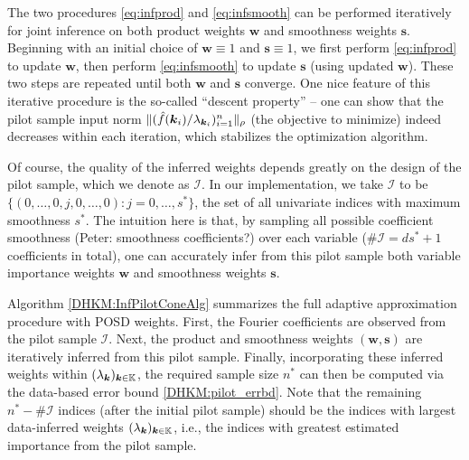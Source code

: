 \documentclass[USenglish]{article}
\theoremstyle{dgthm}
\theoremstyle{dgthm}
\theoremstyle{dgthm}
\theoremstyle{dgthm}
\theoremstyle{dgdef}
\newcommand{\PeterNote}[1]{{\color{orange}Peter: #1}}
\begin{document}
The two procedures \eqref{eq:infprod} and \eqref{eq:infsmooth} can be performed iteratively for joint inference on both product weights $\mathbf{w}$ and smoothness weights $\mathbf{s}$. Beginning with an initial choice of $\mathbf{w} \equiv 1$ and $\mathbf{s} \equiv 1$, we first perform \eqref{eq:infprod} to update $\mathbf{w}$, then perform \eqref{eq:infsmooth} to update $\mathbf{s}$ (using updated $\mathbf{w}$). These two steps are repeated until both $\mathbf{w}$ and $\mathbf{s}$ converge. One nice feature of this iterative procedure is the so-called ``descent property'' -- one can show that the pilot sample input norm $\|(\hat{f}({\boldsymbol{k}}_i)/\lambda_{{\boldsymbol{k}}_i})_{i=1}^n\|_{\rho}$ (the objective to minimize) indeed decreases within each iteration, which stabilizes the optimization algorithm.

Of course, the quality of the inferred weights depends greatly on the design of the pilot sample, which we denote as $\mathcal{I}$. In our implementation, we take $\mathcal{I}$ to be $\{ (0, \ldots, 0, j, 0, \ldots, 0): j = 0, \ldots, s^*\}$, the set of all univariate indices with maximum smoothness $s^*$. The intuition here is that, by sampling all possible coefficient smoothness (\PeterNote{smoothness coefficients?}) over each variable ($\# \mathcal{I} = d s^* + 1$ coefficients in total), one can accurately infer from this pilot sample both variable importance weights $\mathbf{w}$ and smoothness weights $\mathbf{s}$.

Algorithm \ref{DHKM:InfPilotConeAlg} summarizes the full adaptive approximation procedure with POSD weights. First, the Fourier coefficients are observed from the pilot sample $\mathcal{I}$. Next, the product and smoothness weights $(\mathbf{w},\mathbf{s})$ are iteratively inferred from this pilot sample. Finally, incorporating these inferred weights within $(\lambda_{{\boldsymbol{k}}})_{{\boldsymbol{k}} \in \mathbb{K}}$, the required sample size $n^*$ can then be computed via the data-based error bound \eqref{DHKM:pilot_errbd}. Note that the remaining $n^* - \# \mathcal{I}$ indices (after the initial pilot sample) should be the indices with largest data-inferred weights $(\lambda_{{\boldsymbol{k}}})_{{\boldsymbol{k}} \in \mathbb{K}}$, i.e., the indices with greatest estimated importance from the pilot sample.
\end{document}
